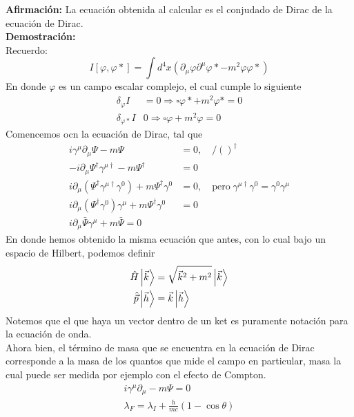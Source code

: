 \documentclass[../main.tex]{subfiles}
\begin{document}
\textbf{Afirmación:} La ecuación obtenida al calcular es el conjudado de Dirac de la ecuación de Dirac. \\
\textbf{Demostración:}  \\
Recuerdo: 
\begin{equation*}
  I[\varphi, \varphi*] = \int d^4 x \left( \partial_\mu \varphi \partial^\mu \varphi* - m^2\varphi \varphi* \right)
\end{equation*}
En donde $\varphi$ es un campo escalar complejo, el cual cumple lo siguiente
\begin{align*}
  \delta_\varphi I & = 0 \Rightarrow \square \varphi* + m^2 \varphi* = 0 \\
  \delta_{\varphi*} I & 0 \Rightarrow \square \varphi + m^2 \varphi = 0
\end{align*}
Comencemos ocn la ecuación de Dirac, tal que
\begin{align*}
  i \gamma^\mu \partial_\mu \Psi - m \Psi & = 0, \quad /()^\dagger \\
  -i\partial_\mu \Psi^\dagger \gamma^{\mu \dagger} - m \Psi^\dagger & = 0 \\
  i \partial_\mu \left( \Psi^\dagger \gamma^{\mu \dagger} \gamma^0 \right) + m\Psi^\dagger \gamma^0 & = 0, \quad \text{pero}\; \gamma^{\mu \dagger} \gamma^0 = \gamma^0 \gamma^\mu \\
  i\partial_\mu \left( \Psi^\dagger \gamma^0 \right)\gamma^\mu + m\Psi^\dagger \gamma^0 & = 0 \\
  i \partial_\mu \bar{\Psi}\gamma^\mu + m\bar{\Psi} = 0
\end{align*}
En donde hemos obtenido la misma ecuación que antes, con lo cual bajo un espacio de Hilbert, podemos definir
\begin{align*}
  \hat{H} \ket{\vec{k}} & = \sqrt{\vec{k}^2 + m^2} \ket{\vec{k}} \\
  \hat{\vec{p}}\ket{\vec{h}} & = \vec{k} \ket{\vec{h}}
\end{align*}
Notemos que el que haya un vector dentro de un ket es puramente notación para la ecuación de onda. \\
Ahora bien, el término de masa que se encuentra en la ecuación de Dirac corresponde a la masa de los quantos que mide el campo en particular, masa la cual puede ser medida por ejemplo con el efecto de Compton. \\
\begin{align}
  i\gamma^\mu \partial_\mu  - m \Psi = 0 \\
  \lambda_F   = \lambda_I + \frac{h}{mc} \left( 1-\cos{\theta} \right)
\end{align}
\end{document}
